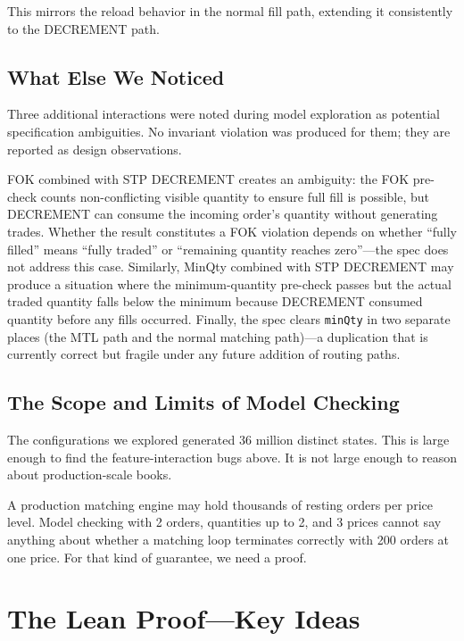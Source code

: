 \documentclass[11pt,a4paper]{article}
\begin{document}
This mirrors the reload behavior in the normal fill path, extending it
consistently to the DECREMENT path.

\subsection{What Else We Noticed}
\label{sec:observations}

Three additional interactions were noted during model exploration as
potential specification ambiguities. No invariant violation was produced
for them; they are reported as design observations.

FOK combined with STP DECREMENT creates an ambiguity: the FOK pre-check
counts non-conflicting visible quantity to ensure full fill is possible,
but DECREMENT can consume the incoming order's quantity without
generating trades. Whether the result constitutes a FOK violation
depends on whether ``fully filled'' means ``fully traded'' or
``remaining quantity reaches zero''---the spec does not address this
case. Similarly, MinQty combined with STP DECREMENT may produce a
situation where the minimum-quantity pre-check passes but the actual
traded quantity falls below the minimum because DECREMENT consumed
quantity before any fills occurred. Finally, the spec clears
\texttt{minQty} in two separate places (the MTL path and the normal
matching path)---a duplication that is currently correct but fragile
under any future addition of routing paths.

\subsection{The Scope and Limits of Model Checking}
\label{sec:tlc-limits}

The configurations we explored generated 36 million distinct states.
This is large enough to find the feature-interaction bugs above. It is
not large enough to reason about production-scale books.

A production matching engine may hold thousands of resting orders per
price level. Model checking with 2 orders, quantities up to 2, and 3
prices cannot say anything about whether a matching loop terminates
correctly with 200 orders at one price. For that kind of guarantee, we
need a proof.


\section{The Lean Proof---Key Ideas}
\label{sec:lean}
\end{document}
